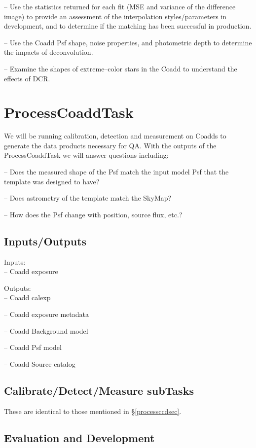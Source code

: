 \documentclass[prd, nofootinbib, floatfix, 11pt,tightenlines,times]{article}
\begin{document}
-- Use the statistics returned for each fit (MSE and variance of the
difference image) to provide an assessment of the interpolation
styles/parameters in development, and to determine if the matching has
been successful in production.

-- Use the Coadd Psf shape, noise properties, and photometric depth to
determine the impacts of deconvolution.

-- Examine the shapes of extreme--color stars in the Coadd to
understand the effects of DCR.



\section{ProcessCoaddTask} 
We will be running calibration, detection and measurement on Coadds to
generate the data products necessary for QA.  With the outputs of the
ProcessCoaddTask we will answer questions including:

-- Does the measured shape of the Psf match the input model Psf that
the template was designed to have?

-- Does astrometry of the template match the SkyMap?

-- How does the Psf change with position, source flux, etc.?

\subsection{Inputs/Outputs}

Inputs: \\
-- Coadd exposure

Outputs:\\
-- Coadd calexp

-- Coadd exposure metadata

-- Coadd Background model

-- Coadd Psf model

-- Coadd Source catalog

\subsection{Calibrate/Detect/Measure subTasks}
These are identical to those mentioned in \S \ref{processccdsec}.

\subsection{Evaluation and Development}
\end{document}
